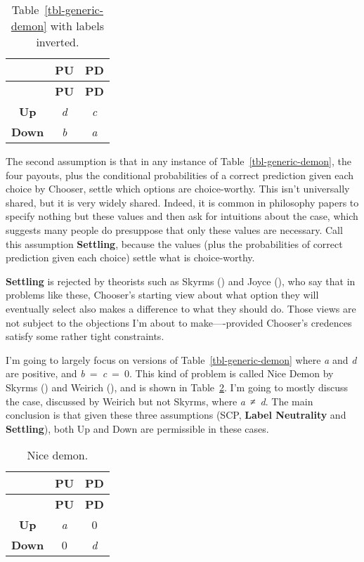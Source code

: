 \documentclass[
  10pt,
  letterpaper,
  DIV=11,
  numbers=noendperiod,
  twoside]{scrartcl}
\begin{document}
\begin{longtable}[]{@{}ccc@{}}
\caption{Table~\ref{tbl-generic-demon} with labels
inverted.}\label{tbl-inverted-generic}\tabularnewline
\toprule\noalign{}
& \textbf{PU} & \textbf{PD} \\
\midrule\noalign{}
\endfirsthead
\toprule\noalign{}
& \textbf{PU} & \textbf{PD} \\
\midrule\noalign{}
\endhead
\bottomrule\noalign{}
\endlastfoot
\textbf{Up} & \emph{d} & \emph{c} \\
\textbf{Down} & \emph{b} & \emph{a} \\
\end{longtable}

The second assumption is that in any instance of
Table~\ref{tbl-generic-demon}, the four payouts, plus the conditional
probabilities of a correct prediction given each choice by Chooser,
settle which options are choice-worthy. This isn't universally shared,
but it is very widely shared. Indeed, it is common in philosophy papers
to specify nothing but these values and then ask for intuitions about
the case, which suggests many people do presuppose that only these
values are necessary. Call this assumption \textbf{Settling}, because
the values (plus the probabilities of correct prediction given each
choice) settle what is choice-worthy.

\textbf{Settling} is rejected by theorists such as Skyrms
() and Joyce
(), who say that in problems like these,
Chooser's starting view about what option they will eventually select
also makes a difference to what they should do. Those views are not
subject to the objections I'm about to make----provided Chooser's
credences satisfy some rather tight constraints.

I'm going to largely focus on versions of Table~\ref{tbl-generic-demon}
where \emph{a} and \emph{d} are positive, and \emph{b}~=~\emph{c}~=~0.
This kind of problem is called Nice Demon by Skyrms
() and Weirich
(), and is shown in
Table~\ref{tbl-nice-demon}. I'm going to mostly discuss the case,
discussed by Weirich but not Skyrms, where \emph{a}~≠~\emph{d}. The main
conclusion is that given these three assumptions (SCP, \textbf{Label
Neutrality} and \textbf{Settling}), both Up and Down are permissible in
these cases.

\begin{longtable}[]{@{}ccc@{}}
\caption{Nice demon.}\label{tbl-nice-demon}\tabularnewline
\toprule\noalign{}
& \textbf{PU} & \textbf{PD} \\
\midrule\noalign{}
\endfirsthead
\toprule\noalign{}
& \textbf{PU} & \textbf{PD} \\
\midrule\noalign{}
\endhead
\bottomrule\noalign{}
\endlastfoot
\textbf{Up} & \emph{a} & 0 \\
\textbf{Down} & 0 & \emph{d} \\
\end{longtable}
\end{document}
